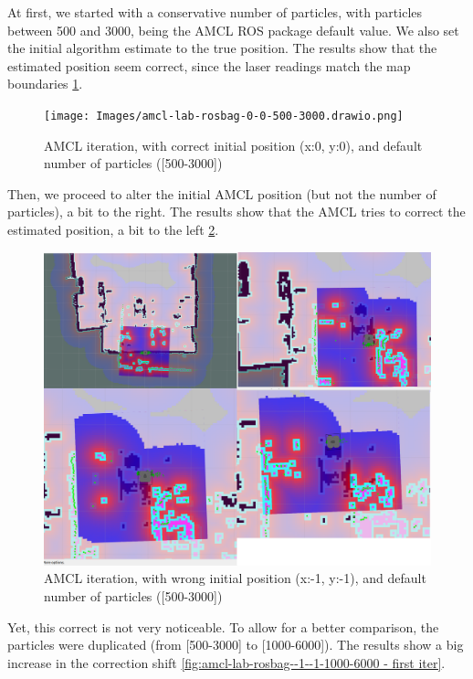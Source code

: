 At first, we started with a conservative number of particles, with particles between 500 and 3000, being the AMCL ROS package default value. We also set the initial algorithm estimate to the true position. The results show that the estimated position seem correct, since the laser readings match the map boundaries \ref{fig:amcl-lab-rosbag-0-0-500-3000}.
\begin{figure}
    \centering
    \texttt{[image: Images/amcl-lab-rosbag-0-0-500-3000.drawio.png]}
   \caption{AMCL iteration, with correct initial position (x:0, y:0), and default number of particles ([500-3000])}
    \label{fig:amcl-lab-rosbag-0-0-500-3000}
\end{figure}

Then, we proceed to alter the initial AMCL position (but not the number of particles), a bit to the right. The results show that the AMCL tries to correct the estimated position, a bit to the left \ref{fig:amcl-lab-rosbag--1--1-500-3000}.

\begin{figure}
    \centering
    \includegraphics[width=1\linewidth]{AMCL iteration, (x -1, y -1)-([500-3000]).png}
    \caption{AMCL iteration, with wrong initial position (x:-1, y:-1), and default number of particles ([500-3000])}
    \label{fig:amcl-lab-rosbag--1--1-500-3000}
\end{figure}

Yet, this correct is not very noticeable. To allow for a better comparison, the particles were duplicated (from [500-3000] to [1000-6000]). The results show a big increase in the correction shift \ref{fig:amcl-lab-rosbag--1--1-1000-6000 - first iter}.

